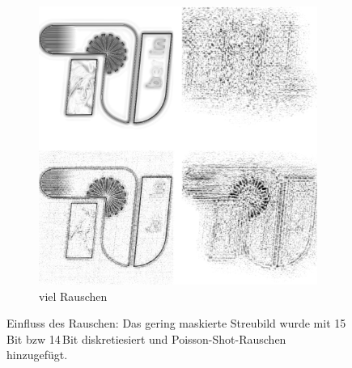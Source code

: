 \begin{figure}
\begin{subfigure}[b]{0.45\textwidth}
		\includegraphics[width=\textwidth]{images/recon2d-mask16bit14.png}
		\caption{viel Rauschen}	
	\end{subfigure}
	\caption[2D Rekonstruktion:Rauschen]{Einfluss des Rauschen: Das gering maskierte Streubild wurde mit 15\,Bit bzw 14\,Bit diskretiesiert und Poisson-Shot-Rauschen hinzugefügt.}
\end{figure}

